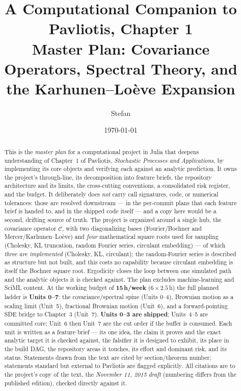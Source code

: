 \documentclass[11pt]{article}
\title{\textbf{A Computational Companion to Pavliotis, Chapter 1}\\[4pt]
\large Master Plan: Covariance Operators, Spectral Theory, and the Karhunen--Lo\`eve Expansion}
\author{Stefan}
\date{\today}
\begin{document}
\maketitle

\begin{abstract}
\noindent This is the \emph{master plan} for a computational project in Julia that deepens
understanding of Chapter~1 of Pavliotis, \emph{Stochastic Processes and Applications}, by
implementing its core objects and verifying each against an analytic prediction. It owns the
project's through-line, its decomposition into feature briefs, the repository architecture and its
limits, the cross-cutting conventions, a consolidated risk register, and the budget. It
deliberately does \emph{not} carry call signatures, code, or numerical tolerances: those are
resolved downstream --- in the per-commit plans that each feature brief is handed to, and in the
shipped code itself --- and a copy here would be a second, drifting source of truth. The project is
organized around a single hub, the covariance operator $\mathcal{C}$, with two diagonalizing bases
(Fourier/Bochner and Mercer/Karhunen--Lo\`eve) and \emph{four} mathematical square roots used for
sampling (Cholesky, KL truncation, random Fourier series, circulant embedding) --- of which
\emph{three are implemented} (Cholesky, KL, circulant); the random-Fourier series is described as
structure but not built, and this costs no capability because circulant embedding is itself the
Bochner square root. Ergodicity closes the loop between one simulated path and the analytic objects
it is checked against. The plan excludes machine-learning and SciML content. At the working budget
of \textbf{15\,h/week} ($6\times 2.5$\,h) the full planned ladder is \textbf{Units 0--7}: the
covariance/spectral spine (Units 0--4), Brownian motion as a scaling limit (Unit~5), fractional
Brownian motion (Unit~6), and a forward-pointing SDE bridge to Chapter~3 (Unit~7). \textbf{Units
0--3 are shipped}; Units~4--5 are committed core; Unit~6 then Unit~7 are the cut order if the buffer
is consumed. Each unit is written as a feature brief --- its one idea, the claim it proves and the
exact analytic target it is checked against, the falsifier it is designed to exhibit, its place in
the build DAG, the repository areas it touches, its effort and dominant risk, and its status.
Statements drawn from the text are cited by section/theorem number; statements standard but external
to Pavliotis are flagged explicitly. All citations are to the project's copy of the text, the
\emph{November 11, 2015 draft} (numbering differs from the published edition), checked directly
against it.
\end{abstract}
\end{document}
